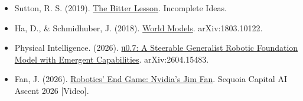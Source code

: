 \vspace{0.25em}
\begin{itemize}
\tightlist
\item
  Sutton, R. S. (2019). \href{http://www.incompleteideas.net/IncIdeas/BitterLesson.html}{The Bitter Lesson}. Incomplete Ideas.
\item
  Ha, D., \& Schmidhuber, J. (2018). \href{https://arxiv.org/abs/1803.10122}{World Models}. arXiv:1803.10122.
\item
  Physical Intelligence. (2026). \href{https://arxiv.org/abs/2604.15483}{π0.7: A Steerable Generalist Robotic Foundation Model with Emergent Capabilities}. arXiv:2604.15483.
\item
  Fan, J. (2026). \href{https://www.youtube.com/watch?v=3Y8aq_ofEVs}{Robotics' End Game: Nvidia's Jim Fan}. Sequoia Capital AI Ascent 2026 {[}Video{]}.
\end{itemize}

\clearpage
